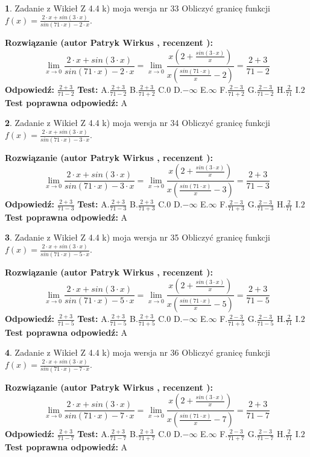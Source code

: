 \documentclass[12pt, a4paper]{article}
\theoremstyle{definition} %
\newtheorem{zad}{}
\newcommand{\zadStart}[1]{\begin{zad}#1\newline}
\newcommand{\zadStop}{\end{zad}}
\newcommand{\rozwStart}[2]{\noindent \textbf{Rozwiązanie (autor #1 , recenzent #2): }\newline}
\newcommand{\rozwStop}{\newline}
\newcommand{\odpStart}{\noindent \textbf{Odpowiedź:}\newline}
\newcommand{\odpStop}{\newline}
\newcommand{\testStart}{\noindent \textbf{Test:}\newline}
\newcommand{\testStop}{\newline}
\newcommand{\kluczStart}{\noindent \textbf{Test poprawna odpowiedź:}\newline}
\newcommand{\kluczStop}{\newline}
\begin{document}
\zadStart{Zadanie z Wikieł Z 4.4 k) moja wersja nr 33}
Obliczyć granicę funkcji $f(x)=\frac{2\cdot x +sin(3\cdot x)}{sin(71\cdot x) -2\cdot x}$.
\zadStop
\rozwStart{Patryk Wirkus}{}
$$\lim\limits_{x\to 0}\frac{2\cdot x +sin(3\cdot x)}{sin(71\cdot x) -2\cdot x}
=\lim\limits_{x\to 0}\frac{x(2+\frac{sin(3\cdot x)}{x})}{x(\frac{sin(71\cdot x)}{x}-2)}
=\frac{2+3}{71-2}$$
\rozwStop
\odpStart
$\frac{2+3}{71-2}$
\odpStop
\testStart
A.$\frac{2+3}{71-2}$
B.$\frac{2+3}{71+2}$
C.$0$
D.$-\infty$
E.$\infty$
F.$\frac{2-3}{71+2}$
G.$\frac{2-3}{71-2}$
H.$\frac{2}{71}$
I.$2$
\testStop
\kluczStart
A
\kluczStop



\zadStart{Zadanie z Wikieł Z 4.4 k) moja wersja nr 34}
Obliczyć granicę funkcji $f(x)=\frac{2\cdot x +sin(3\cdot x)}{sin(71\cdot x) -3\cdot x}$.
\zadStop
\rozwStart{Patryk Wirkus}{}
$$\lim\limits_{x\to 0}\frac{2\cdot x +sin(3\cdot x)}{sin(71\cdot x) -3\cdot x}
=\lim\limits_{x\to 0}\frac{x(2+\frac{sin(3\cdot x)}{x})}{x(\frac{sin(71\cdot x)}{x}-3)}
=\frac{2+3}{71-3}$$
\rozwStop
\odpStart
$\frac{2+3}{71-3}$
\odpStop
\testStart
A.$\frac{2+3}{71-3}$
B.$\frac{2+3}{71+3}$
C.$0$
D.$-\infty$
E.$\infty$
F.$\frac{2-3}{71+3}$
G.$\frac{2-3}{71-3}$
H.$\frac{2}{71}$
I.$2$
\testStop
\kluczStart
A
\kluczStop



\zadStart{Zadanie z Wikieł Z 4.4 k) moja wersja nr 35}
Obliczyć granicę funkcji $f(x)=\frac{2\cdot x +sin(3\cdot x)}{sin(71\cdot x) -5\cdot x}$.
\zadStop
\rozwStart{Patryk Wirkus}{}
$$\lim\limits_{x\to 0}\frac{2\cdot x +sin(3\cdot x)}{sin(71\cdot x) -5\cdot x}
=\lim\limits_{x\to 0}\frac{x(2+\frac{sin(3\cdot x)}{x})}{x(\frac{sin(71\cdot x)}{x}-5)}
=\frac{2+3}{71-5}$$
\rozwStop
\odpStart
$\frac{2+3}{71-5}$
\odpStop
\testStart
A.$\frac{2+3}{71-5}$
B.$\frac{2+3}{71+5}$
C.$0$
D.$-\infty$
E.$\infty$
F.$\frac{2-3}{71+5}$
G.$\frac{2-3}{71-5}$
H.$\frac{2}{71}$
I.$2$
\testStop
\kluczStart
A
\kluczStop



\zadStart{Zadanie z Wikieł Z 4.4 k) moja wersja nr 36}
Obliczyć granicę funkcji $f(x)=\frac{2\cdot x +sin(3\cdot x)}{sin(71\cdot x) -7\cdot x}$.
\zadStop
\rozwStart{Patryk Wirkus}{}
$$\lim\limits_{x\to 0}\frac{2\cdot x +sin(3\cdot x)}{sin(71\cdot x) -7\cdot x}
=\lim\limits_{x\to 0}\frac{x(2+\frac{sin(3\cdot x)}{x})}{x(\frac{sin(71\cdot x)}{x}-7)}
=\frac{2+3}{71-7}$$
\rozwStop
\odpStart
$\frac{2+3}{71-7}$
\odpStop
\testStart
A.$\frac{2+3}{71-7}$
B.$\frac{2+3}{71+7}$
C.$0$
D.$-\infty$
E.$\infty$
F.$\frac{2-3}{71+7}$
G.$\frac{2-3}{71-7}$
H.$\frac{2}{71}$
I.$2$
\testStop
\kluczStart
A
\kluczStop
\end{document}
